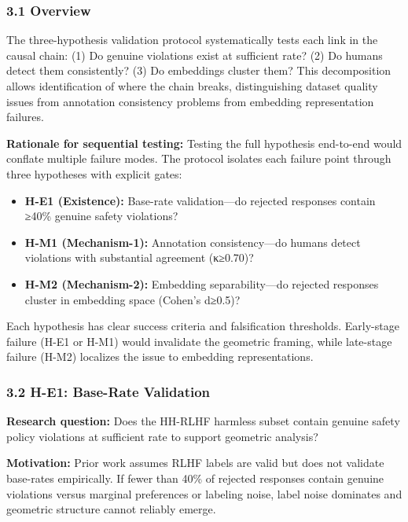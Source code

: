 
\subsubsection{3.1 Overview}

The three-hypothesis validation protocol systematically tests each link in the causal chain: (1) Do genuine violations exist at sufficient rate? (2) Do humans detect them consistently? (3) Do embeddings cluster them? This decomposition allows identification of where the chain breaks, distinguishing dataset quality issues from annotation consistency problems from embedding representation failures.

\textbf{Rationale for sequential testing:} Testing the full hypothesis end-to-end would conflate multiple failure modes. The protocol isolates each failure point through three hypotheses with explicit gates:

\begin{itemize}
\item \textbf{H-E1 (Existence):} Base-rate validation—do rejected responses contain ≥40\% genuine safety violations?
\item \textbf{H-M1 (Mechanism-1):} Annotation consistency—do humans detect violations with substantial agreement (κ≥0.70)?
\item \textbf{H-M2 (Mechanism-2):} Embedding separability—do rejected responses cluster in embedding space (Cohen's d≥0.5)?
\end{itemize}

Each hypothesis has clear success criteria and falsification thresholds. Early-stage failure (H-E1 or H-M1) would invalidate the geometric framing, while late-stage failure (H-M2) localizes the issue to embedding representations.

\subsubsection{3.2 H-E1: Base-Rate Validation}

\textbf{Research question:} Does the HH-RLHF harmless subset contain genuine safety policy violations at sufficient rate to support geometric analysis?

\textbf{Motivation:} Prior work assumes RLHF labels are valid but does not validate base-rates empirically. If fewer than 40\% of rejected responses contain genuine violations versus marginal preferences or labeling noise, label noise dominates and geometric structure cannot reliably emerge.

